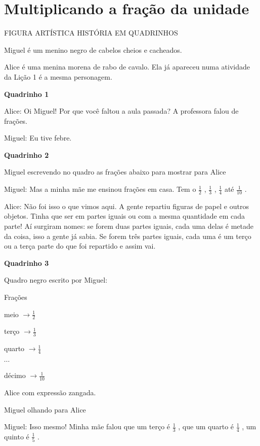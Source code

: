 \documentclass[a4,12pt]{book}
\begin{document}
\chapter{Multiplicando a fração da unidade }


\begin{imagem*}[breakable]{}{}   FIGURA ARTÍSTICA  
  HISTÓRIA EM QUADRINHOS  
  
  Miguel é um menino negro de cabelos cheios e cacheados.  
  
  Alice é uma menina morena de rabo de cavalo. Ela já apareceu numa atividade da Lição 1 é a mesma personagem.  
  
  {\bf Quadrinho 1}  
  
  Alice: Oi Miguel! Por que você faltou a aula passada? A professora falou de frações.  
  
  Miguel: Eu tive febre.   
  
  {\bf Quadrinho 2}  
  
  Miguel escrevendo no quadro as frações abaixo para mostrar para Alice  
  
  Miguel: Mas a minha mãe me ensinou frações em casa. Tem o   $\frac{1}{2}$  ,   $\frac{1}{3}$  ,   $\frac{1}{4}$   até   $\frac{1}{10}$  .  
  
  Alice: Não foi isso o que vimos aqui. A gente repartiu figuras de papel e outros objetos. Tinha que ser em partes iguais ou com a mesma quantidade em cada parte! Aí surgiram nomes: se forem duas partes iguais, cada uma delas é metade da coisa, isso a gente já sabia. Se forem três partes iguais, cada uma é um terço ou a terça parte do que foi repartido e assim vai.  
  
  {\bf Quadrinho 3}  
  
  Quadro negro escrito por Miguel:  
  
  Frações  
  
  meio   $\longrightarrow \frac{1}{2}$     
  
  terço   $\longrightarrow \frac{1}{3}$  
  
  quarto   $\longrightarrow \frac{1}{4}$  
  
  $\cdots$  
  
  décimo   $\longrightarrow \frac{1}{10}$  
  
  Alice com expressão zangada.  
  
  Miguel olhando para Alice  
  
  Miguel: Isso mesmo! Minha mãe falou que um terço é   $\frac{1}{3}$  , que um quarto é   $\frac{1}{4}$  , um quinto é   $\frac{1}{5}$  .  
  

\end{imagem*}
\end{document}
